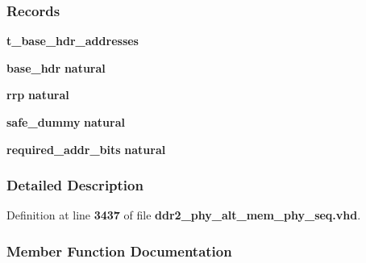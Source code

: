 \subsubsection*{Records}
 \begin{DoxyCompactItemize}
\item 
{\bf t\+\_\+base\+\_\+hdr\+\_\+addresses} {\bfseries  }
\item 
{\bf base\+\_\+hdr} {\bfseries {\bfseries \textcolor{comment}{natural}\textcolor{vhdlchar}{ }}} 
\item 
{\bf rrp} {\bfseries {\bfseries \textcolor{comment}{natural}\textcolor{vhdlchar}{ }}} 
\item 
{\bf safe\+\_\+dummy} {\bfseries {\bfseries \textcolor{comment}{natural}\textcolor{vhdlchar}{ }}} 
\item 
{\bf required\+\_\+addr\+\_\+bits} {\bfseries {\bfseries \textcolor{comment}{natural}\textcolor{vhdlchar}{ }}} 
\end{DoxyCompactItemize}


\subsubsection{Detailed Description}


Definition at line {\bf 3437} of file {\bf ddr2\+\_\+phy\+\_\+alt\+\_\+mem\+\_\+phy\+\_\+seq.\+vhd}.



\subsubsection{Member Function Documentation}
